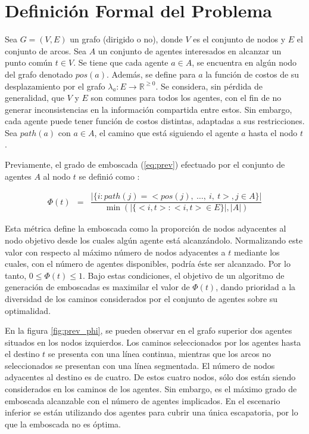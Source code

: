 \section{Definici\'on Formal del Problema}
\label{sec:definition}

Sea $G = (V,E)$ un grafo (dirigido o no), donde $V$ es el conjunto de
nodos y $E$ el conjunto de arcos. Sea $A$ un conjunto de agentes
interesados en alcanzar un punto com\'un $t \in V$. Se tiene
que cada agente $a \in A$, se encuentra en algún nodo del grafo
denotado $pos(a)$. Además, se define para $a$ la función
de costos de su desplazamiento por el grafo
$\lambda_a : E \longrightarrow \mathbb{R}^{\geq 0}$.
Se considera, sin pérdida de generalidad, que $V$ y $E$ son comunes para
todos los agentes, con el fin de no generar inconsistencias en la
información compartida entre estos. Sin embargo, cada agente puede tener
función de costos distintas, adaptadas a sus restricciones.
Sea $path(a)$ con $a \in A$, el camino que está siguiendo el agente
$a$ hasta el nodo $t$.

Previamente, el grado de emboscada (\ref{eq:prev})
efectuado por el conjunto de agentes
$A$ al nodo $t$ se defini\'o como \cite{FGC12e}\cite{FGC12}:

\begin{small}
\begin{eqnarray}
 \Phi(t) &=& 
 \dfrac{|\{ i : path(j) = <pos(j),\ \ldots,\ i,\ t>, j \in A\}|}
	  {\min(|\{ <i,t> : <i,t> \in E \} |,|A|) }
\label{eq:prev}
\end{eqnarray}
\end{small}

Esta m\'etrica define la emboscada como la proporción de nodos adyacentes
al nodo objetivo desde los cuales algún agente está alcanzándolo. Normalizando
este valor con res\-pec\-to al m\'aximo n\'umero de nodos adyacentes a $t$ mediante
los cuales, con el n\'umero de agentes disponibles, podr\'ia \'este ser alcanzado.
Por lo tanto, $0 \leq \Phi(t) \leq 1$. Bajo estas condiciones, el objetivo
de un algoritmo de generaci\'on de emboscadas es maximilar el
valor de $\Phi(t)$, dando prioridad a la diversidad de los caminos
considerados por el conjunto de agentes sobre su optimalidad.

En la figura \ref{fig:prev_phi}, se pueden observar en el grafo
superior dos agentes situados en los nodos izquierdos. Los caminos
seleccionados por los agentes hasta el destino $t$ se presenta con
una l\'inea continua, mientras que los arcos no seleccionados se
presentan con una l\'inea segmentada. El n\'umero de nodos adyacentes
al destino es de cuatro. De estos cuatro nodos, s\'olo dos están siendo
considerados en los caminos de los agentes. Sin embargo, es el m\'aximo
grado de emboscada alcanzable con el n\'umero de agentes implicados.
En el escenario inferior se est\'an utilizando dos agentes para cubrir
una \'unica escapatoria, por lo que la emboscada no es \'optima.

